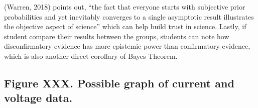 (Warren, 2018) points out, “the fact that everyone starts with subjective prior probabilities and yet inevitably converges to a single asymptotic result illustrates the objective aspect of science” which can help build trust in science. Lastly, if student compare their results between the groups, students can note how disconfirmatory evidence has more epistemic power than confirmatory evidence, which is also another direct corollary of Bayes Theorem.

\subsection{Figure XXX. Possible graph of current and voltage data.}
